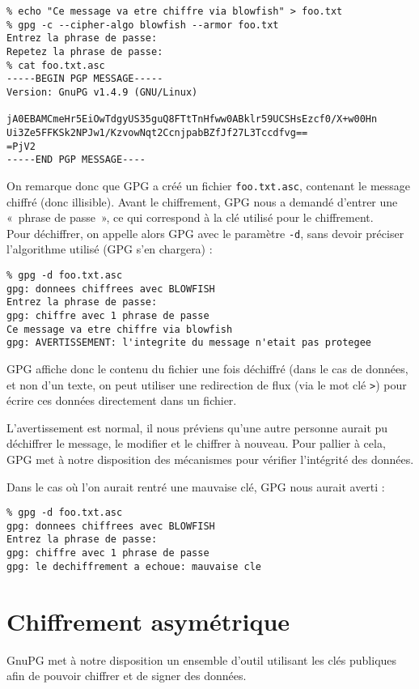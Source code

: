 \begin{lstlisting}
% echo "Ce message va etre chiffre via blowfish" > foo.txt
% gpg -c --cipher-algo blowfish --armor foo.txt
Entrez la phrase de passe: 
Repetez la phrase de passe: 
% cat foo.txt.asc
-----BEGIN PGP MESSAGE-----
Version: GnuPG v1.4.9 (GNU/Linux)

jA0EBAMCmeHr5EiOwTdgyUS35guQ8FTtTnHfww0ABklr59UCSHsEzcf0/X+w00Hn
Ui3Ze5FFKSk2NPJw1/KzvowNqt2CcnjpabBZfJf27L3Tccdfvg==
=PjV2
-----END PGP MESSAGE----
\end{lstlisting}

On remarque donc que GPG a créé un fichier \texttt{foo.txt.asc},
contenant le message chiffré (donc illisible). 
Avant le chiffrement, GPG nous a
demandé d'entrer une «~phrase de passe~», ce qui correspond à la
clé utilisé pour le chiffrement.
\\

Pour déchiffrer, on appelle alors GPG avec le paramètre
\texttt{-d}, sans devoir préciser l'algorithme utilisé (GPG s'en
chargera) : 

\begin{lstlisting}
% gpg -d foo.txt.asc 
gpg: donnees chiffrees avec BLOWFISH
Entrez la phrase de passe: 
gpg: chiffre avec 1 phrase de passe
Ce message va etre chiffre via blowfish
gpg: AVERTISSEMENT: l'integrite du message n'etait pas protegee
\end{lstlisting}

GPG affiche donc le contenu du fichier une fois déchiffré (dans le
cas de données, et non d'un texte, on peut utiliser une
redirection de flux (via le mot clé \texttt{>}) pour écrire ces 
données directement dans un fichier.

L'avertissement est normal, il nous préviens qu'une autre personne
aurait pu déchiffrer le message, le modifier et le chiffrer à
nouveau. Pour pallier à cela, GPG met à notre disposition des
mécanismes pour vérifier l'intégrité des données. 

Dans le cas où l'on aurait rentré une mauvaise clé, GPG nous
aurait averti : 
\begin{lstlisting}
% gpg -d foo.txt.asc
gpg: donnees chiffrees avec BLOWFISH
Entrez la phrase de passe:
gpg: chiffre avec 1 phrase de passe
gpg: le dechiffrement a echoue: mauvaise cle
\end{lstlisting}

\section{Chiffrement asymétrique}
GnuPG met à notre disposition un ensemble d'outil utilisant les
clés publiques afin de pouvoir chiffrer et de signer des données.

